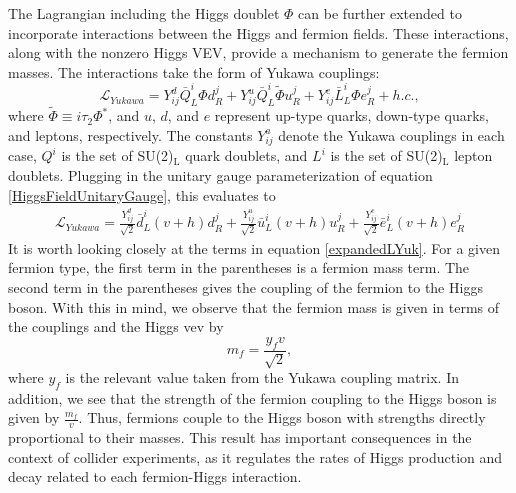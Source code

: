 The Lagrangian including the Higgs doublet $\Phi$ can be further extended to incorporate interactions between the Higgs and fermion fields. These interactions, along with the nonzero Higgs VEV, provide a mechanism to generate the fermion masses. The interactions take the 
form of Yukawa couplings:
\begin{equation}
    \mathcal{L}_{Yukawa} = Y_{ij}^{d}\bar{Q}^{i}_{L}\Phi d_{R}^{j} + Y_{ij}^{u}\bar{Q}^{i}_{L}\tilde{\Phi} u_{R}^{j} 
    + Y_{ij}^{e}\bar{L}^{i}_{L}\Phi e_{R}^{j} + h.c.,
    \label{LYukawa}
\end{equation}
where $\tilde{\Phi} \equiv i\tau_{2}\Phi^{*}$, and $u$, $d$, and $e$ represent up-type quarks, down-type quarks, and leptons, respectively. The constants $Y_{ij}^a$ denote the Yukawa couplings in each case, $Q^i$ is the set of SU(2)$_{\mathrm{L}}$ quark doublets, and $L^i$ is the set of SU(2)$_{\mathrm{L}}$ lepton doublets.
Plugging in the unitary gauge parameterization of equation \ref{HiggsFieldUnitaryGauge}, this evaluates to 
\begin{align}
    \mathcal{L}_{Yukawa} = \frac{Y_{ij}^{d}}{\sqrt{2}}\bar{d}_{L}^{i}(v + h)d_{R}^{j} 
    + \frac{Y_{ij}^{u}}{\sqrt{2}}\bar{u}_{L}^{i}(v+h)u_{R}^{j} + \frac{Y_{ij}^{e}}{\sqrt{2}}\bar{e}_{L}^{i}(v+h)e_{R}^{j}
    \label{expandedLYuk}
\end{align}
It is worth looking closely at the terms in equation \ref{expandedLYuk}. For a given fermion type, the first term in the parentheses
is a fermion mass term. The second term in the parentheses gives the coupling of the fermion to the Higgs boson. With this in mind, 
we observe that the fermion mass is given in terms of the couplings and the Higgs vev by 
\begin{equation}
    m_{f} = \frac{y_{f}v}{\sqrt{2}},
    \label{fermionMass}
\end{equation}
where $y_{f}$ is the relevant value taken from the Yukawa coupling matrix. In addition, we see that the strength of the fermion coupling
to the Higgs boson is given by $\frac{m_{f}}{v}$. Thus, fermions couple to the Higgs boson with strengths directly proportional 
to their masses. This result has important consequences in the context of collider experiments, as it regulates the rates of
Higgs production and decay related to each fermion-Higgs interaction. 

